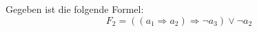 \begin{questions}
\begin{parts}
% 
	\end{parts}

	\question Gegeben ist die folgende Formel:
	\begin{equation*}
		F_2 = ((a_1 \Rightarrow a_2) \Rightarrow \neg a_3) \vee \neg a_2
	\end{equation*}

	\begin{parts}

\end{parts}
\end{questions}
